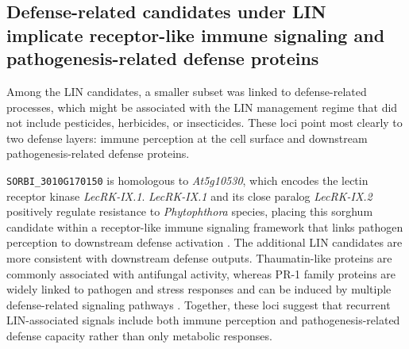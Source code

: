 \documentclass[9pt,twocolumn,twoside]{rilabRxiv}
\begin{document}

\subsection{Defense-related candidates under LIN implicate receptor-like immune signaling and pathogenesis-related defense proteins}

Among the LIN candidates, a smaller subset was linked to defense-related processes, which might be associated with the LIN management regime that did not include pesticides, herbicides, or insecticides. These loci point most clearly to two defense layers: immune perception at the cell surface and downstream pathogenesis-related defense proteins. 

\texttt{SORBI\_3010G170150} is homologous to \textit{At5g10530}, which encodes the lectin receptor kinase \textit{LecRK-IX.1}. \textit{LecRK-IX.1} and its close paralog \textit{LecRK-IX.2} positively regulate resistance to \textit{Phytophthora} species, placing this sorghum candidate within a receptor-like immune signaling framework that links pathogen perception to downstream defense activation \citep{Wang2015LecRKIX}. The additional LIN candidates are more consistent with downstream defense outputs. Thaumatin-like proteins are commonly associated with antifungal activity, whereas PR-1 family proteins are widely linked to pathogen and stress responses and can be induced by multiple defense-related signaling pathways \citep{Gladman2022SorghumBase,Ma2022ZmPR1}. Together, these loci suggest that recurrent LIN-associated signals include both immune perception and pathogenesis-related defense capacity rather than only metabolic responses.

\end{document}
